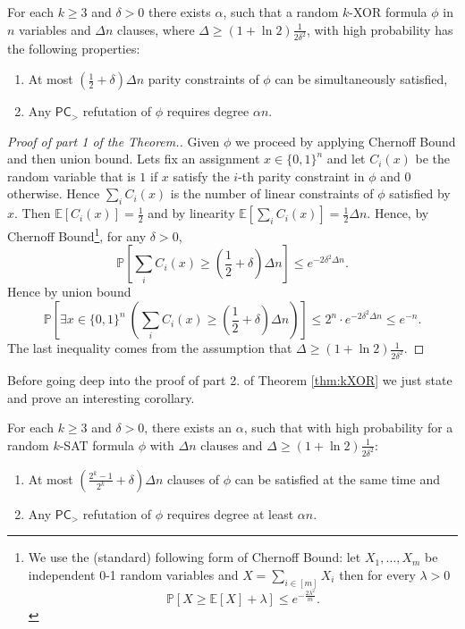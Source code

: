 \documentclass[a4paper,twoside,justified]{tufte-handout}
\begin{document}
\begin{theorem}\label{thm:kXOR}
For each $k\geq 3$ and $\delta>0$ there exists $\alpha$, such that a random $k$-XOR formula $\phi$ in $n$ variables and $\Delta n$ clauses, where $\Delta \geq (1+\ln 2)\frac{1}{2\delta^2}$, with high probability has the following properties:
\begin{enumerate}
\item At most $\left( \frac{1}{2}+\delta\right)\Delta n$ parity constraints of $\phi$ can be simultaneously satisfied,
\item Any $\mathsf{PC}_>$ refutation of $\phi$ requires degree $\alpha n$.
\end{enumerate}
\end{theorem}

\begin{proof}[Proof of part 1 of the Theorem.]
Given $\phi$ we proceed by applying Chernoff Bound and then union bound. Lets fix an assignment $x\in \{0,1\}^n$ and let $C_i(x)$ be the random variable that is $1$ if $x$ satisfy the $i$-th parity constraint in $\phi$ and $0$ otherwise. Hence $\sum_i C_i(x)$ is the number of linear constraints of $\phi$ satisfied by $x$. Then $\mathbb{E}[C_i(x)]=\frac{1}{2}$ and by linearity $
\mathbb{E}[\sum_i C_i(x)]=\frac{1}{2}\Delta n$.
Hence, by Chernoff Bound\footnote{
We use the (standard) following form of Chernoff Bound: let $X_1,\ldots, X_m$ be independent 0-1 random variables and $X=\sum_{i\in [m]} X_i$ then for every $\lambda >0$ 
\begin{equation*}
\mathbb{P}\left[X\geq \mathbb{E}[X]+\lambda\right]\leq e^{-\frac{2\lambda^2}{m}}.
\end{equation*}

}, for any $\delta>0$,
\begin{equation*}
\mathbb{P}\left[\sum_i C_i(x)\geq (\frac{1}{2}+\delta)\Delta n\right]\leq e^{-2\delta^2\Delta n}.
\end{equation*}
Hence by union bound 
\begin{equation*}
\mathbb{P}\left[\exists x\in \{0,1\}^n\ \left(\sum_i C_i(x)\geq (\frac{1}{2}+\delta)\Delta n\right)\right]\leq 2^n \cdot e^{-2\delta^2\Delta n}\leq e^{-n}.
\end{equation*}
The last inequality comes from the assumption that $\Delta\geq (1+\ln 2)\frac{1}{2\delta^2}$.
\end{proof}
Before going deep into the proof of part 2. of Theorem \ref{thm:kXOR} we just state and prove an interesting corollary.

\begin{corollary}\label{cor:randomCNF}
For each $k\geq 3$ and $\delta>0$, 
there exists an $\alpha$, 
such that with high probability
for a random $k$-SAT formula $\phi$ with $\Delta n$ clauses and $\Delta\geq (1+\ln 2)\frac{1}{2\delta^2}$:
\begin{enumerate}
\item At most $\left(\frac{2^k-1}{2^k}+\delta\right)\Delta n$ clauses of $\phi$ can be satisfied at the same time and
\item Any $\mathsf{PC}_>$ refutation of $\phi$ requires degree at least $\alpha n$.
\end{enumerate}
\end{corollary}
\end{document}
